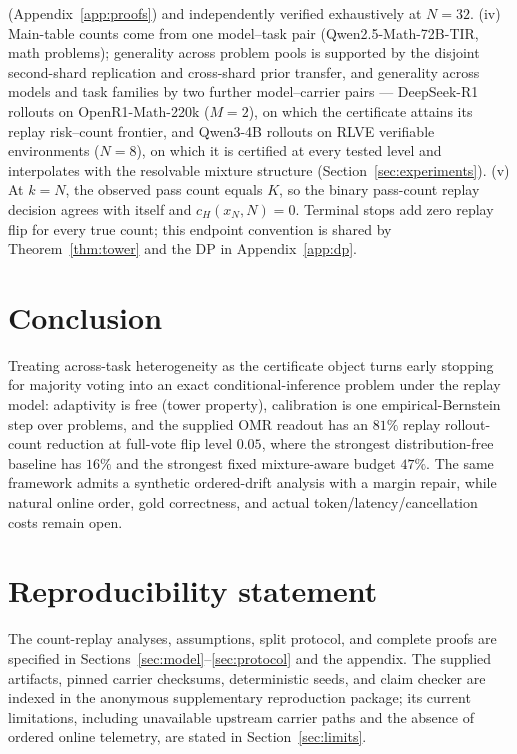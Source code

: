 \documentclass{article}
\theoremstyle{definition}
\theoremstyle{remark}
\newcommand{\cert}{c_H}
\begin{document}
(Appendix~\ref{app:proofs}) and independently verified exhaustively at
$N=32$.
(iv) Main-table counts come from one model--task pair
(Qwen2.5-Math-72B-TIR, math problems); generality across problem pools is
supported by the disjoint second-shard replication and cross-shard prior
transfer, and generality across models and task families by two further
model--carrier pairs --- DeepSeek-R1 rollouts on OpenR1-Math-220k ($M=2$),
on which the certificate attains its replay risk--count frontier, and
Qwen3-4B rollouts on RLVE verifiable environments ($N=8$), on which it is
certified at every tested level and interpolates with the resolvable mixture
structure (Section~\ref{sec:experiments}).
(v) At $k=N$, the observed pass count equals $K$, so the binary pass-count
replay decision agrees with itself and $\cert(x_N,N)=0$. Terminal stops add
zero replay flip for every true count; this endpoint convention is shared by
Theorem~\ref{thm:tower} and the DP in Appendix~\ref{app:dp}.

\section{Conclusion}
Treating across-task heterogeneity as the certificate object turns early
stopping for majority voting into an exact conditional-inference problem under
the replay model: adaptivity is free (tower property), calibration is one
empirical-Bernstein step over problems, and the supplied OMR readout has an
$81\%$ replay rollout-count reduction at full-vote flip level $0.05$, where
the strongest distribution-free baseline has $16\%$ and the strongest fixed
mixture-aware budget $47\%$. The same framework admits a synthetic
ordered-drift analysis with a margin repair, while natural online order, gold
correctness, and actual token/latency/cancellation costs remain open.

\section*{Reproducibility statement}
The count-replay analyses, assumptions, split protocol, and complete proofs
are specified in Sections~\ref{sec:model}--\ref{sec:protocol} and the
appendix. The supplied artifacts, pinned carrier checksums, deterministic
seeds, and claim checker are indexed in the anonymous supplementary
reproduction package; its current limitations, including unavailable upstream
carrier paths and the absence of ordered online telemetry, are stated in
Section~\ref{sec:limits}.
\end{document}
